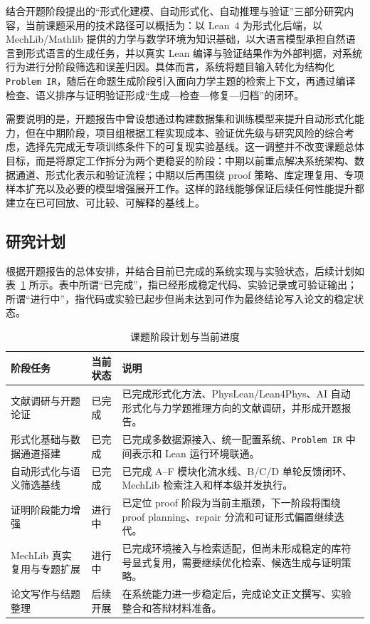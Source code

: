 \documentclass[12pt,a4paper]{ctexart}
\begin{document}
结合开题阶段提出的“形式化建模、自动形式化、自动推理与验证”三部分研究内容，当前课题采用的技术路径可以概括为：以 Lean~4 为形式化后端，以 MechLib/Mathlib 提供的力学与数学环境为知识基础，以大语言模型承担自然语言到形式语言的生成任务，并以真实 Lean 编译与验证结果作为外部判据，对系统行为进行分阶段筛选和误差归因。具体而言，系统将题目输入转化为结构化 \texttt{Problem IR}，随后在命题生成阶段引入面向力学主题的检索上下文，再通过编译检查、语义排序与证明验证形成“生成—检查—修复—归档”的闭环。

需要说明的是，开题报告中曾设想通过构建数据集和训练模型来提升自动形式化能力，但在中期阶段，项目组根据工程实现成本、验证优先级与研究风险的综合考虑，选择先完成无专项训练条件下的可复现实验基线。这一调整并不改变课题总体目标，而是将原定工作拆分为两个更稳妥的阶段：中期以前重点解决系统架构、数据通道、形式化表示和验证流程；中期以后再围绕 proof 策略、库定理复用、专项样本扩充以及必要的模型增强展开工作。这样的路线能够保证后续任何性能提升都建立在已可回放、可比较、可解释的基线上。

\subsection{研究计划}

根据开题报告的总体安排，并结合目前已完成的系统实现与实验状态，后续计划如表~\ref{tab:plan} 所示。表中所谓“已完成”，指已经形成稳定代码、实验记录或可验证输出；所谓“进行中”，指代码或实验已起步但尚未达到可作为最终结论写入论文的稳定状态。

\begin{table}[htbp]
    \centering
    \caption{课题阶段计划与当前进度}
    \label{tab:plan}
    \begin{tabularx}{\textwidth}{>{\raggedright\arraybackslash}p{3cm} >{\raggedright\arraybackslash}p{2cm} X}
        \toprule
        阶段任务 & 当前状态 & 说明 \\
        \midrule
        文献调研与开题论证 & 已完成 & 已完成形式化方法、PhysLean/Lean4Phys、AI 自动形式化与力学题推理方向的文献调研，并形成开题报告。 \\
        形式化基础与数据通道搭建 & 已完成 & 已完成多数据源接入、统一配置系统、\texttt{Problem IR} 中间表示和 Lean 运行环境联通。 \\
        自动形式化与语义筛选基线 & 已完成 & 已完成 A--F 模块化流水线、B/C/D 单轮反馈闭环、MechLib 检索注入和样本级并发执行。 \\
        证明阶段能力增强 & 进行中 & 已定位 proof 阶段为当前主瓶颈，下一阶段将围绕 proof planning、repair 分流和可证形式偏置继续迭代。 \\
        MechLib 真实复用与专题扩展 & 进行中 & 已完成环境接入与检索适配，但尚未形成稳定的库符号显式复用，需要继续优化检索、候选生成与证明策略。 \\
        论文写作与结题整理 & 后续开展 & 在系统能力进一步稳定后，完成论文正文撰写、实验整合和答辩材料准备。 \\
        \bottomrule
    \end{tabularx}
\end{table}
\end{document}
